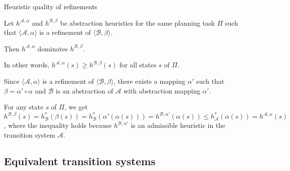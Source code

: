 \documentclass{gkibeamer}
\begin{document}
\begin{frame}{Heuristic quality of refinements}
  \begin{theorem}
    Let $h^{\mathcal A, \alpha}$ and $h^{\mathcal B, \beta}$
    be abstraction heuristics for the same planning task $\Pi$
    such that $\langle \mathcal A, \alpha\rangle$ is a refinement of
    $\langle\mathcal B, \beta\rangle$.

    Then $h^{\mathcal A, \alpha}$ dominates $h^{\mathcal B, \beta}$.
  \end{theorem}

  In other words, $h^{\mathcal A, \alpha}(s) \ge h^{\mathcal B,
    \beta}(s)$ for all states $s$ of $\Pi$.

  \pause

  \begin{proofstart}
    Since $\langle \mathcal A, \alpha\rangle$ is a refinement of
    $\langle\mathcal B, \beta\rangle$, there exists a mapping
    $\alpha'$ such that $\beta = \alpha' \circ \alpha$ and
    $\mathcal B$ is an abstraction of $\mathcal A$ with abstraction
    mapping $\alpha'$.

    For any state $s$ of $\Pi$, we get
    $h^{\mathcal B, \beta}(s)
    = h^*_{\mathcal B}(\beta(s))
    = h^*_{\mathcal B}(\alpha'(\alpha(s)))
    = h^{\mathcal B, \alpha'}(\alpha(s))
    \le h^*_{\mathcal A}(\alpha(s))
    = h^{\mathcal A, \alpha}(s)$, where the inequality holds because
    $h^{\mathcal B, \alpha'}$ is an admissible heuristic in the
    transition system $\mathcal A$.
  \end{proofstart}
\end{frame}

\subsection[Equivalence]{Equivalent transition systems}
\end{document}
